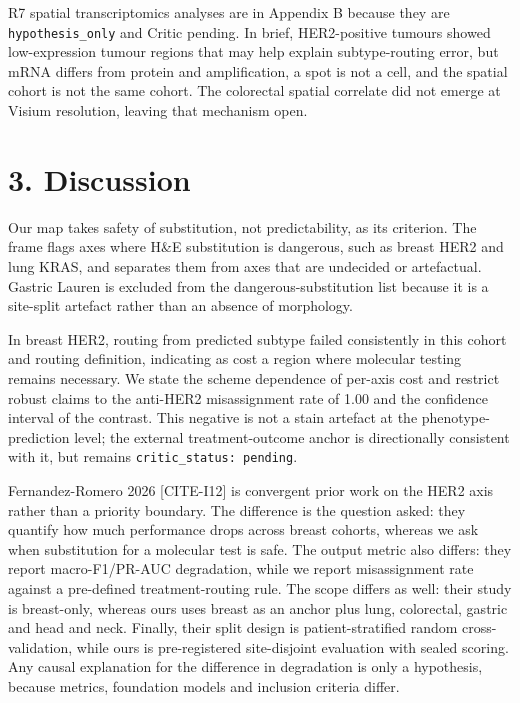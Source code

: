 R7 spatial transcriptomics analyses are in Appendix B because they are \texttt{hypothesis\_only} and Critic pending. In brief, HER2-positive tumours showed low-expression tumour regions that may help explain subtype-routing error, but mRNA differs from protein and amplification, a spot is not a cell, and the spatial cohort is not the same cohort. The colorectal spatial correlate did not emerge at Visium resolution, leaving that mechanism open.

\section*{3. Discussion}

Our map takes safety of substitution, not predictability, as its criterion. The frame flags axes where H\&E substitution is dangerous, such as breast HER2 and lung KRAS, and separates them from axes that are undecided or artefactual. Gastric Lauren is excluded from the dangerous-substitution list because it is a site-split artefact rather than an absence of morphology.

In breast HER2, routing from predicted subtype failed consistently in this cohort and routing definition, indicating as cost a region where molecular testing remains necessary. We state the scheme dependence of per-axis cost and restrict robust claims to the anti-HER2 misassignment rate of 1.00 and the confidence interval of the contrast. This negative is not a stain artefact at the phenotype-prediction level; the external treatment-outcome anchor is directionally consistent with it, but remains \texttt{critic\_status: pending}.

Fernandez-Romero 2026 [CITE-I12] is convergent prior work on the HER2 axis rather than a priority boundary. The difference is the question asked: they quantify how much performance drops across breast cohorts, whereas we ask when substitution for a molecular test is safe. The output metric also differs: they report macro-F1/PR-AUC degradation, while we report misassignment rate against a pre-defined treatment-routing rule. The scope differs as well: their study is breast-only, whereas ours uses breast as an anchor plus lung, colorectal, gastric and head and neck. Finally, their split design is patient-stratified random cross-validation, while ours is pre-registered site-disjoint evaluation with sealed scoring. Any causal explanation for the difference in degradation is only a hypothesis, because metrics, foundation models and inclusion criteria differ.

